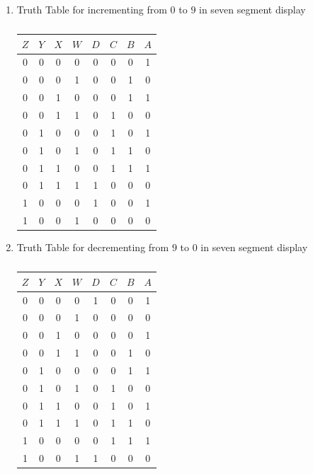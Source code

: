 \documentclass[conference]{IEEEtran}
\begin{document}
\begin{enumerate}
\item {Truth Table for incrementing from $0$ to $9$ in seven segment display }
	\vspace{0.4cm}

\begin{table}[htbp]
    \centering
\begin{tabular}
{ | c | c | c | c | c | c | c | c | } \hline
$Z$ & $Y$ & $X$ & $W$ & $D$ & $C$ & $B$ & $A$\\\hline
0   & 0   & 0   & 0   & 0  & 0 & 0  & 1 \\
0   & 0   & 0   & 1   & 0  & 0 & 1  & 0 \\
0   & 0   & 1   & 0   & 0  & 0 & 1  & 1 \\
0   & 0   & 1   & 1   & 0  & 1 & 0  & 0 \\
0   & 1   & 0   & 0   & 0  & 1 & 0  & 1 \\  
0   & 1   & 0   & 1   & 0  & 1 & 1  & 0 \\
0   & 1   & 1   & 0   & 0  & 1 & 1  & 1 \\  
0   & 1   & 1   & 1   & 1  & 0 & 0  & 0 \\
1   & 0   & 0   & 0   & 1  & 0 & 0  & 1 \\
1   & 0   & 0   & 1   & 0  & 0 & 0  & 0 \\ \hline
\end{tabular}
\vspace{0.15cm}
\caption{\label{tab:widgets}}
\end{table}

\item {Truth Table for decrementing from $9$ to $0$ in seven segment display }

\begin{table}[htbp]
    \centering
\begin{tabular}
{ | c | c | c | c | c | c | c | c | } \hline
$Z$ & $Y$ & $X$ & $W$ & $D$ & $C$ & $B$ & $A$\\\hline
0   & 0   & 0   & 0   & 1  & 0 & 0  & 1 \\
0   & 0   & 0   & 1   & 0  & 0 & 0  & 0 \\
0   & 0   & 1   & 0   & 0  & 0 & 0  & 1 \\
0   & 0   & 1   & 1   & 0  & 0 & 1  & 0 \\
0   & 1   & 0   & 0   & 0  & 0 & 1  & 1 \\  
0   & 1   & 0   & 1   & 0  & 1 & 0  & 0 \\
0   & 1   & 1   & 0   & 0  & 1 & 0  & 1 \\  
0   & 1   & 1   & 1   & 0  & 1 & 1  & 0 \\
1   & 0   & 0   & 0   & 0  & 1 & 1  & 1 \\
1   & 0   & 0   & 1   & 1  & 0 & 0  & 0 \\ \hline
\end{tabular}
\vspace{0.15cm}
\caption{\label{tab:widgets}}
\end{table}
	

\end{enumerate}
\end{document}
